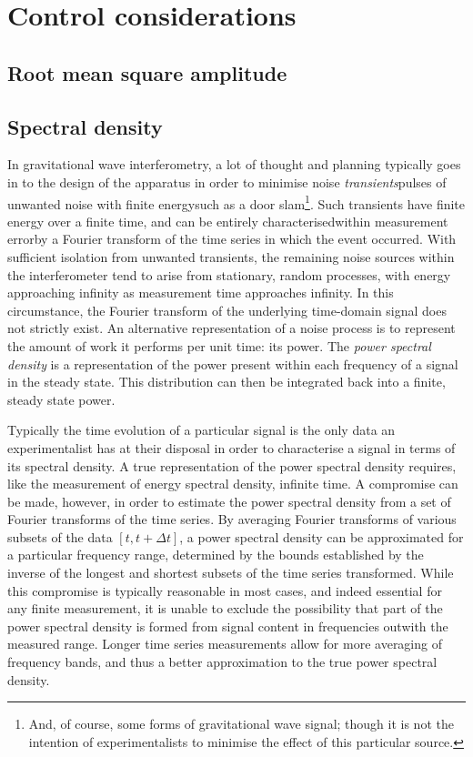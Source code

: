 \section{Control considerations}

\subsection{Root mean square amplitude}

\subsection{Spectral density}
In gravitational wave interferometry, a lot of thought and planning typically goes in to the design of the apparatus in order to minimise noise \emph{transients}\textemdash pulses of unwanted noise with finite energy\textemdash such as a door slam\footnote{And, of course, some forms of gravitational wave signal; though it is not the intention of experimentalists to minimise the effect of this particular source.}. Such transients have finite energy over a finite time, and can be entirely characterised\textemdash within measurement error\textemdash by a Fourier transform of the time series in which the event occurred. With sufficient isolation from unwanted transients, the remaining noise sources within the interferometer tend to arise from stationary, random processes, with energy approaching infinity as measurement time approaches infinity. In this circumstance, the Fourier transform of the underlying time-domain signal does not strictly exist. An alternative representation of a noise process is to represent the amount of work it performs per unit time: its power. The \emph{power spectral density} is a representation of the power present within each frequency of a signal in the steady state. This distribution can then be integrated back into a finite, steady state power.

Typically the time evolution of a particular signal is the only data an experimentalist has at their disposal in order to characterise a signal in terms of its spectral density. A true representation of the power spectral density requires, like the measurement of energy spectral density, infinite time. A compromise can be made, however, in order to estimate the power spectral density from a set of Fourier transforms of the time series. By averaging Fourier transforms of various subsets of the data $\left[ t, t + \Delta t \right]$, a power spectral density can be approximated for a particular frequency range, determined by the bounds established by the inverse of the longest and shortest subsets of the time series transformed. While this compromise is typically reasonable in most cases, and indeed essential for any finite measurement, it is unable to exclude the possibility that part of the power spectral density is formed from signal content in frequencies outwith the measured range. Longer time series measurements allow for more averaging of frequency bands, and thus a better approximation to the true power spectral density.

